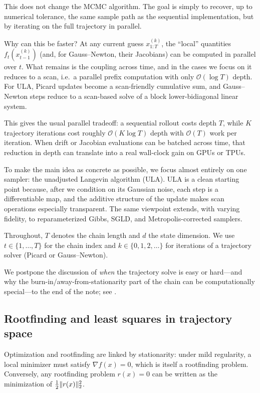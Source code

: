 \documentclass[11pt]{article}
\begin{document}
This does not change the MCMC algorithm.
The goal is simply to recover, up to numerical tolerance, the same sample path as the sequential implementation, but by iterating on the full trajectory in parallel.

Why can this be faster?
At any current guess $x_{1:T}^{(k)}$, the ``local'' quantities $f_t(x_{t-1}^{(k)})$ (and, for Gauss--Newton, their Jacobians) can be computed in parallel over $t$.
What remains is the coupling across time, and in the cases we focus on it reduces to a scan, i.e.\ a parallel prefix computation with only $\mathcal{O}(\log T)$ depth.
For ULA, Picard updates become a scan-friendly cumulative sum, and Gauss--Newton steps reduce to a scan-based solve of a block lower-bidiagonal linear system.

This gives the usual parallel tradeoff: a sequential rollout costs depth $T$, while $K$ trajectory iterations cost roughly $\mathcal{O}(K\log T)$ depth with $\mathcal{O}(T)$ work per iteration.
When drift or Jacobian evaluations can be batched across time, that reduction in depth can translate into a real wall-clock gain on GPUs or TPUs.

To make the main idea as concrete as possible, we focus almost entirely on one sampler: the unadjusted Langevin algorithm (ULA).
ULA is a clean starting point because, after we condition on its Gaussian noise, each step is a differentiable map, and the additive structure of the update makes scan operations especially transparent.
The same viewpoint extends, with varying fidelity, to reparameterized Gibbs, SGLD, and Metropolis-corrected samplers.

Throughout, $T$ denotes the chain length and $d$ the state dimension.
We use $t\in\{1,\dots,T\}$ for the chain index and $k\in\{0,1,2,\dots\}$ for iterations of a trajectory solver (Picard or Gauss--Newton).

We postpone the discussion of \emph{when} the trajectory solve is easy or hard---and why the burn-in/away-from-stationarity part of the chain can be computationally special---to the end of the note; see .

\subsection{Rootfinding and least squares in trajectory space}
\label{subsec:residual}

Optimization and rootfinding are linked by stationarity: under mild regularity, a local minimizer must satisfy $\nabla f(x)=0$, which is itself a rootfinding problem.
Conversely, any rootfinding problem $r(x)=0$ can be written as the minimization of $\tfrac12\lVert r(x)\rVert_2^2$.
\end{document}
